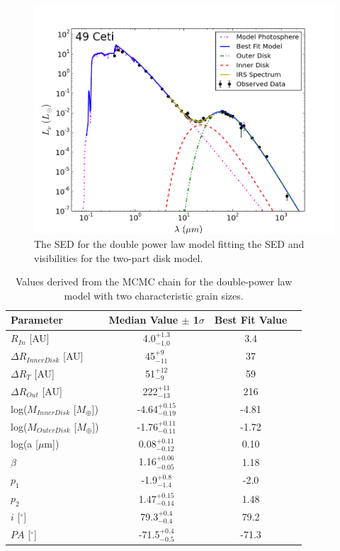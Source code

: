 {{\begin{figure}[t!]
\label{fig:49CET_DP_SED}
\centering
\includegraphics[width = 1\textwidth]{49CET_dPBAG_SED2.png}
\caption{The SED for the double power law model fitting the SED and visibilities for the two-part disk model. }
\label{fig:49CET_dPBAG_SED}
\end{figure}

\begin{table}[t!]
\begin{center}
    \def\arraystretch{1.37}%
    \begin{tabular}{l*{2}{c}r}
    \hline
    Parameter & Median Value $\pm$ 1$\sigma$ & Best Fit Value \\ \hline
     $R_{In}$  [AU] & 4.0$^{+1.3}_{-1.0}$ & 3.4\\  
     $\Delta R_{Inner Disk}$ [AU] & 45$^{+9}_{-11}$ & 37\\ 
     $\Delta R_{T}$ [AU] & 51$^{+12}_{-9}$ & 59\\ 
     $\Delta R_{Out}$  [AU] & 222$^{+11}_{-13}$ & 216\\ 
     log($M_{Inner Disk}$ [$M_{\oplus}$]) & -4.64$^{+0.15}_{-0.19}$ & -4.81 \\
     log($M_{Outer Disk}$ [$M_{\oplus}$]) & -1.76$^{+0.11}_{-0.11}$ &-1.72 \\
     log(a [$\mu$m]) & 0.08$^{+0.11}_{-0.12}$ & 0.10\\ 
     $\beta$ & 1.16$^{+0.06}_{-0.05}$ & 1.18\\ 
     $p_{1}$ & -1.9$^{+0.8}_{-1.4}$ & -2.0\\ 
     $p_{2}$ & 1.47$^{+0.15}_{-0.14}$ & 1.48\\ 
     $i$ [$^\circ$] & 79.3$^{+0.4}_{-0.4}$ & 79.2 \\ 
     $PA$ [$^\circ$] & -71.5$^{+0.4}_{-0.5}$ & -71.3\\
    \hline
    \end{tabular}
\end{center}
\caption{Values derived from the MCMC chain for the double-power law model with two characteristic grain sizes.}
\label{tab:dPBAG_Table}
\end{table}

}}
